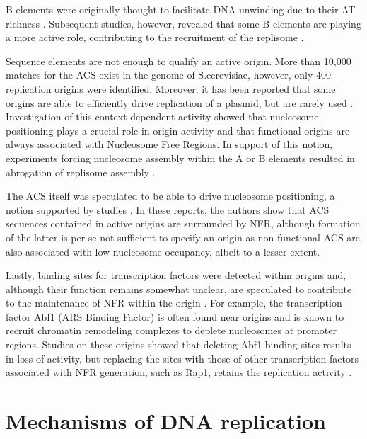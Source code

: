 B elements were originally thought to facilitate DNA unwinding due to their AT-richness \cite{huang:1993:dna}. Subsequent studies, however, revealed that some B elements are playing a more active role, contributing to the recruitment of the replisome \cite{wilmes:2002:b2}.


\vspace{5mm}

Sequence elements are not enough to qualify an active origin. 
More than 10,000 matches for the ACS exist in the genome of S.cerevisiae, however, only 400 replication origins were identified. 
Moreover, it has been reported that some origins are able to efficiently drive replication of a plasmid, but are rarely used \invivo{} \cite{newlon:1993:analysis, santocanale:1999:activation}. 
Investigation of this context-dependent activity showed that nucleosome positioning plays a crucial role in origin activity and that functional origins are always associated with Nucleosome Free Regions. 
In support of this notion, experiments forcing nucleosome assembly within the A or B elements resulted in abrogation of replisome assembly \cite{lipford:2001:nucleosomes}. 


The ACS itself was speculated to be able to drive nucleosome positioning, a notion supported by \invivo{} studies \cite{eaton:2010:conserved, berbenetz:2010:diversity}.
In these reports, the authors show that ACS sequences contained in active origins are surrounded by NFR, although formation of the latter is per se not sufficient to specify an origin as non-functional ACS are also associated with low nucleosome occupancy, albeit to a lesser extent.


Lastly, binding sites for transcription factors were detected within origins and, although their function remains somewhat unclear, are speculated to contribute to the maintenance of NFR within the origin \cite{diffley:1992:proteindna, rhode:1989:gene}. 
For example, the transcription factor Abf1 (ARS Binding Factor) is often found near origins and is known to recruit chromatin remodeling complexes to deplete nucleosomes at promoter regions. 
Studies on these origins showed that deleting Abf1 binding sites results in loss of activity, but replacing the sites with those of other transcription factors associated with NFR generation, such as Rap1, retains the replication activity \cite{marahrens:1992:yeast}.


\section{Mechanisms of DNA replication}

